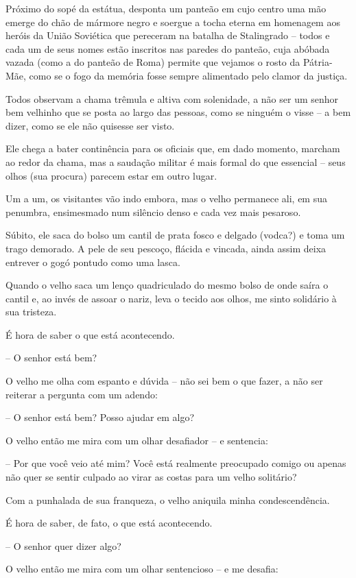 Próximo do sopé da estátua, desponta um panteão em cujo centro uma mão
emerge do chão de mármore negro e soergue a tocha eterna em homenagem
aos heróis da União Soviética que pereceram na batalha de Stalingrado --
todos e cada um de seus nomes estão inscritos nas paredes do panteão,
cuja abóbada vazada (como a do panteão de Roma) permite que vejamos o
rosto da Pátria-Mãe, como se o fogo da memória fosse sempre alimentado
pelo clamor da justiça.

Todos observam a chama trêmula e altiva com solenidade, a não ser um
senhor bem velhinho que se posta ao largo das pessoas, como se ninguém o
visse -- a bem dizer, como se ele não quisesse ser visto.

Ele chega a bater continência para os oficiais que, em dado momento,
marcham ao redor da chama, mas a saudação militar é mais formal do que
essencial -- seus olhos (sua procura) parecem estar em outro lugar.

Um a um, os visitantes vão indo embora, mas o velho permanece ali, em
sua penumbra, ensimesmado num silêncio denso e cada vez mais pesaroso.

Súbito, ele saca do bolso um cantil de prata fosco e delgado (vodca?) e
toma um trago demorado. A pele de seu pescoço, flácida e vincada, ainda
assim deixa entrever o gogó pontudo como uma lasca.

Quando o velho saca um lenço quadriculado do mesmo bolso de onde saíra o
cantil e, ao invés de assoar o nariz, leva o tecido aos olhos, me sinto
solidário à sua tristeza.

É hora de saber o que está acontecendo.

-- O senhor está bem?

O velho me olha com espanto e dúvida -- não sei bem o que fazer, a não
ser reiterar a pergunta com um adendo:

-- O senhor está bem? Posso ajudar em algo?

O velho então me mira com um olhar desafiador -- e sentencia:

-- Por que você veio até mim? Você está realmente preocupado comigo ou
apenas não quer se sentir culpado ao virar as costas para um velho
solitário?

Com a punhalada de sua franqueza, o velho aniquila minha
condescendência.

É hora de saber, de fato, o que está acontecendo.

-- O senhor quer dizer algo?

O velho então me mira com um olhar sentencioso -- e me desafia:


